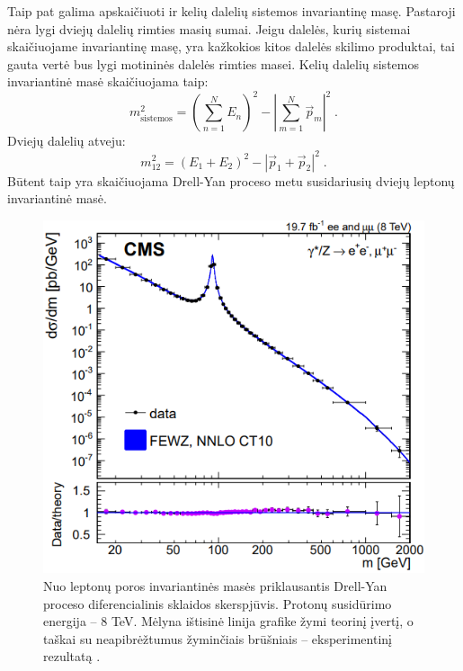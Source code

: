\documentclass[a4paper, 12pt]{article}
\newlength\q
\begin{document}
Taip pat galima apskaičiuoti ir kelių dalelių sistemos invariantinę masę.
Pastaroji nėra lygi dviejų dalelių rimties masių sumai.
Jeigu dalelės, kurių sistemai skaičiuojame invariantinę masę, yra kažkokios kitos dalelės
skilimo produktai, tai gauta vertė bus lygi motininės dalelės rimties masei.
Kelių dalelių sistemos invariantinė masė skaičiuojama taip:
\begin{equation}
	m_{\mathrm{sistemos}}^{2} = \left( \sum_{n=1}^{N} E_{n} \right)^{2} -
	\left| \sum_{m=1}^{N} \vec{p}_{m} \right|^{2} \; .
	\label{eq:minvm}
\end{equation}
Dviejų dalelių atveju:
\begin{equation}
	m_{12}^2 = ( E_{1} + E_{2} )^{2} - | \vec{p}_{1} + \vec{p}_{2} |^{2} \; .
	\label{eq:tinvm}
\end{equation}
Būtent taip yra skaičiuojama Drell-Yan proceso metu susidariusių dviejų leptonų invariantinė masė.

\begin{centering}
\begin{figure}[H]
\centering
\includegraphics[scale=0.6]{DYeeCS.PNG}
\vspace{-0.2cm}
\caption{\label{fig:DYeeCS}
Nuo leptonų poros invariantinės masės priklausantis Drell-Yan proceso diferencialinis sklaidos skerspjūvis.
Protonų susidūrimo energija -- $8$ TeV.
Mėlyna ištisinė linija grafike žymi teorinį įvertį, o taškai su neapibrėžtumus žyminčiais brūšniais --
eksperimentinį rezultatą \cite{DYpic}.
}
\end{figure}
\end{centering}
\end{document}
